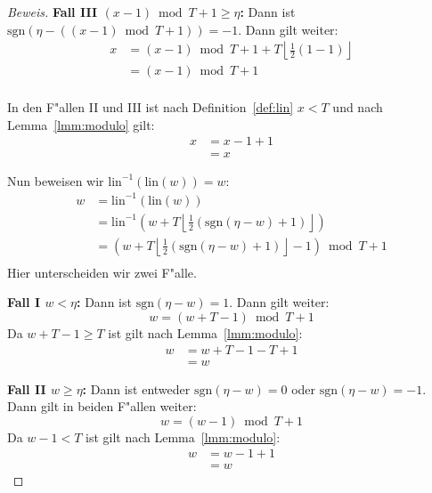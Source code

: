 \documentclass[a4paper]{article}
\newcommand*{\linf}{\mathrm{lin}}
\newcommand*{\sgn}{\mathrm{sgn}}
\numberwithin{equation}{section}
\begin{document}
\begin{proof}[Beweis]
  \noindent\textbf{Fall III $(x - 1) \bmod T + 1 \ge \eta$:} Dann ist
  $\sgn(\eta - ((x - 1) \bmod T + 1)) = -1$. Dann gilt weiter:
  \begin{equation}
  \begin{split}
    x & = (x - 1) \bmod T + 1 + T\left\lfloor\frac{1}{2} (1 - 1)\right\rfloor \\
    & = (x - 1) \bmod T + 1 \\
  \end{split}
  \end{equation}

  \noindent In den F"allen II und III ist nach Definition~\ref{def:lin} $x < T$
  und nach Lemma~\ref{lmm:modulo} gilt:
  \begin{equation}
  \begin{split}
    x & = x - 1 + 1 \\
    & = x
  \end{split}
  \end{equation}

  \noindent Nun beweisen wir $\linf^{-1}(\linf(w)) = w$:
  \begin{equation}
  \begin{split}
    w & = \linf^{-1}(\linf(w)) \\
    & = \linf^{-1}(w + T\left\lfloor\frac{1}{2}
      (\sgn(\eta - w) + 1)\right\rfloor) \\
    & = (w + T\left\lfloor\frac{1}{2}
      (\sgn(\eta - w) + 1)\right\rfloor - 1) \bmod T + 1 \\
  \end{split}
  \end{equation}
  Hier unterscheiden wir zwei F"alle.

  \noindent\textbf{Fall I $w < \eta$:} Dann ist $\sgn(\eta - w) = 1$. Dann gilt
  weiter:
  \begin{equation}w = (w + T - 1) \bmod T + 1\end{equation}
  Da $w + T - 1 \ge T$ ist gilt nach Lemma~\ref{lmm:modulo}:
  \begin{equation}
  \begin{split}
    w & = w + T - 1 - T + 1 \\
    & = w
  \end{split}
  \end{equation}

  \noindent\textbf{Fall II $w \ge \eta$:} Dann ist entweder $\sgn(\eta - w) = 0$
  oder $\sgn(\eta - w) = -1$. Dann gilt in beiden F"allen weiter:
  \begin{equation}w = (w - 1) \bmod T + 1\end{equation}
  Da $w - 1 < T$ ist gilt nach Lemma~\ref{lmm:modulo}:
  \begin{equation}
  \begin{split}
    w & = w - 1 + 1 \\
    & = w
  \end{split}
  \end{equation}
\end{proof}
\end{document}
